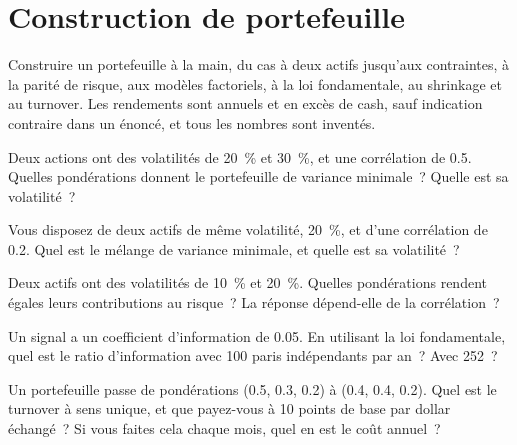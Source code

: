 \chapter{Construction de portefeuille}\label{ch:iv2:portfolio-construction}

\begin{ivtrains}
Construire un portefeuille à la main, du cas à deux actifs jusqu'aux contraintes, à la parité de risque, aux modèles factoriels, à la loi fondamentale, au shrinkage et au turnover. Les rendements sont annuels et en excès de cash, sauf indication contraire dans un énoncé, et tous les nombres sont inventés.
\end{ivtrains}

\begin{question}\label{iq:iv2:portfolio-construction:1}
Deux actions ont des volatilités de 20~\% et 30~\%, et une corrélation de 0.5. Quelles pondérations donnent le portefeuille de variance minimale~? Quelle est sa volatilité~?
\end{question}

\begin{question}\label{iq:iv2:portfolio-construction:2}
Vous disposez de deux actifs de même volatilité, 20~\%, et d'une corrélation de 0.2. Quel est le mélange de variance minimale, et quelle est sa volatilité~?
\end{question}

\begin{question}\label{iq:iv2:portfolio-construction:3}
Deux actifs ont des volatilités de 10~\% et 20~\%. Quelles pondérations rendent égales leurs contributions au risque~? La réponse dépend-elle de la corrélation~?
\end{question}

\begin{question}\label{iq:iv2:portfolio-construction:4}
Un signal a un coefficient d'information de 0.05. En utilisant la loi fondamentale, quel est le ratio d'information avec 100 paris indépendants par an~? Avec 252~?
\end{question}

\begin{question}\label{iq:iv2:portfolio-construction:5}
Un portefeuille passe de pondérations (0.5, 0.3, 0.2) à (0.4, 0.4, 0.2). Quel est le turnover à sens unique, et que payez-vous à 10 points de base par dollar échangé~? Si vous faites cela chaque mois, quel en est le coût annuel~?
\end{question}


